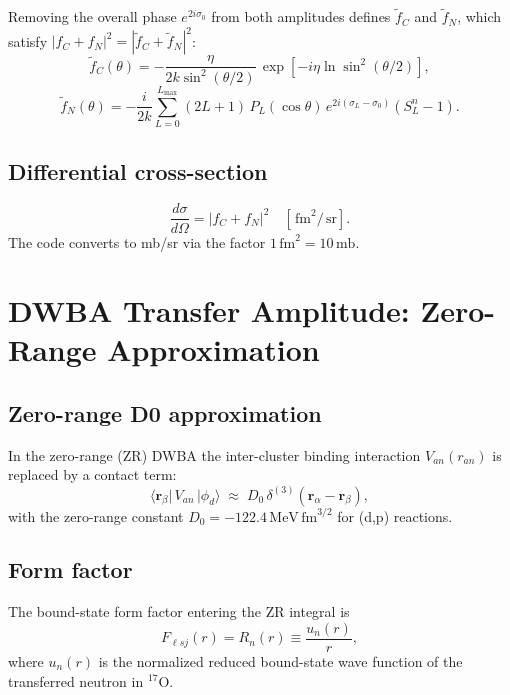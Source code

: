 \documentclass[12pt,a4paper]{article}
\newcommand{\fm}{\,\mathrm{fm}}
\newcommand{\MeV}{\,\mathrm{MeV}}
\newcommand{\sr}{\,\mathrm{sr}}
\newcommand{\mb}{\,\mathrm{mb}}
\begin{document}
Removing the overall phase $e^{2i\sigma_0}$ from both amplitudes
defines $\tilde{f}_C$ and $\tilde{f}_N$, which satisfy
$|f_C+f_N|^2 = |\tilde{f}_C+\tilde{f}_N|^2$:
\begin{equation}
  \tilde{f}_C(\theta) = -\frac{\eta}{2k\sin^2(\theta/2)}\,
  \exp\!\left[-i\eta\ln\sin^2(\theta/2)\right],
\end{equation}
\begin{equation}
  \tilde{f}_N(\theta) = -\frac{i}{2k}\sum_{L=0}^{L_\mathrm{max}}
  (2L+1)\,P_L(\cos\theta)\,e^{2i(\sigma_L-\sigma_0)}\!\left(S_L^n - 1\right).
\end{equation}

\subsection{Differential cross-section}

\begin{equation}
  \frac{d\sigma}{d\Omega} = |f_C+f_N|^2
  \quad \left[\fm^2/\sr\right].
\end{equation}
The code converts to mb/sr via the factor $1\fm^2 = 10\mb$.

\section{DWBA Transfer Amplitude: Zero-Range Approximation}

\subsection{Zero-range D0 approximation}

In the zero-range (ZR) DWBA the inter-cluster binding interaction
$V_{an}(r_{an})$ is replaced by a contact term:
\begin{equation}
  \langle\mathbf{r}_\beta|\,V_{an}\,|\phi_d\rangle
  \;\approx\;
  D_0\,\delta^{(3)}(\mathbf{r}_\alpha - \mathbf{r}_\beta),
  \label{eq:zero-range}
\end{equation}
with the zero-range constant $D_0 = -122.4\MeV\fm^{3/2}$ for (d,p)
reactions.

\subsection{Form factor}

The bound-state form factor entering the ZR integral is
\begin{equation}
  F_{\ell s j}(r) = R_n(r) \equiv \frac{u_n(r)}{r},
  \label{eq:form-factor}
\end{equation}
where $u_n(r)$ is the normalized reduced bound-state wave function of
the transferred neutron in ${}^{17}\mathrm{O}$.
\end{document}
